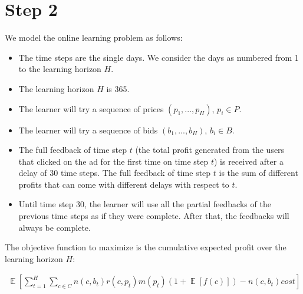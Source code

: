 \documentclass[11pt]{article} %
\DeclareMathOperator{\EX}{\mathbb{E}}
\begin{document}
\section{Step 2}
We model the online learning problem as follows:
\begin{itemize}
\item The time steps are the single days. We consider the days as numbered from 1 to the learning horizon $H$.
\item The learning horizon $H$ is 365.
\item The learner will try a sequence of prices $(p_1, ..., p_H)$, $p_i \in P$.
\item The learner will try a sequence of bids $(b_1, ..., b_H)$, $b_i \in B$.
\item The full feedback of time step $t$ (the total profit generated from the users that clicked on the ad for the first time on time step $t$) is received after a delay of 30 time steps. The full feedback of time step $t$ is the sum of different profits that can come with different delays with respect to $t$.
\item Until time step 30, the learner will use all the partial feedbacks of the previous time steps as if they were complete. After that, the feedbacks will always be complete.
\end{itemize}

The objective function to maximize is the cumulative expected profit over the learning horizon $H$:

\begin{align*}
\EX\left[\sum_{t=1}^H{\sum_{c \in C}{n(c,b_t)r(c,p_t)m(p_t)(1+\EX[f(c)])-n(c,b_t)cost}}\right]
\end{align*}

\appendix
\end{document}
